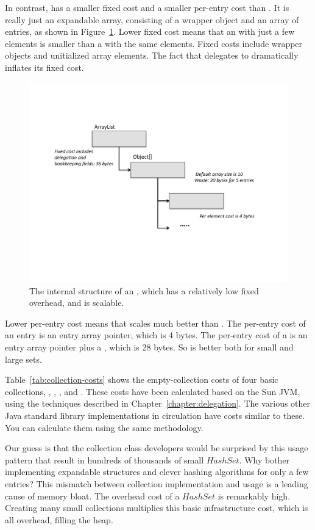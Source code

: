 In contrast,  has a smaller fixed cost and a smaller
per-entry cost than . It is really just an expandable array,
consisting of a wrapper object and an array of entries, as shown in Figure~\ref{fig:arraylist}. 
Lower fixed cost means that an  with just a few
 elements is smaller than a  with the same elements. Fixed costs
 include wrapper objects and unitialized array elements. The fact that 
 delegates to  dramatically inflates its fixed cost. 
 \begin{figure}
  \centering
 \includegraphics[width=.80\textwidth]{part1/Figures/collections/arraylist.pdf}
  \caption{The internal structure of an , which has a
  relatively low fixed overhead, and is scalable.}
  \label{fig:arraylist}
\end{figure}
 Lower per-entry cost means that
  scales much better than . The per-entry cost
 of an  entry is an entry array pointer, which is 4 bytes.
 The per-entry cost of a  is an entry array pointer plus a
 , which is 28 bytes. So   is better
 both for small and large sets.

Table~\ref{tab:collection-costs} shows the empty-collection costs of four basic
collections, , , , and . These costs have been
calculated based on the Sun JVM, using the techniques
described in Chapter~\ref{chapter:delegation}. The various other Java standard
library implementations in circulation have costs
similar to these. You can calculate them using the same methodology.

Our guess is that the
collection class developers would be surprised by this usage pattern that result
in hundreds of thousands of small $HashSet$. Why bother implementing expandable
structures and clever hashing algorithms for only a few entries?
This mismatch between collection implementation and usage is 
a leading cause of memory bloat. The overhead cost of a $HashSet$ is remarkably
high. Creating many small collections multiplies this basic infrastructure
cost, which is all overhead, filling the heap. 


